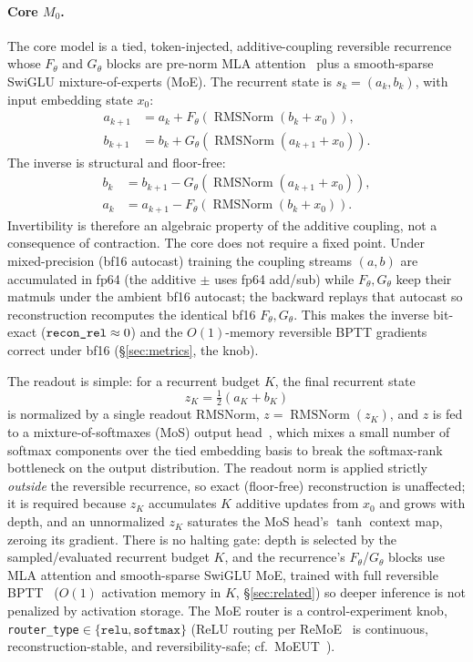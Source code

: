 \documentclass[11pt]{article}
\newcommand{\RMSNorm}{\operatorname{RMSNorm}}
\newcommand{\code}[1]{\texttt{#1}}
\begin{document}
\paragraph{Core \(M_0\).}
The core model is a tied, token-injected, additive-coupling reversible recurrence whose \(F_\theta\)
and \(G_\theta\) blocks are pre-norm MLA attention~\cite{deepseekv2} plus a smooth-sparse SwiGLU
mixture-of-experts (MoE).  The recurrent state is
\(s_k=(a_k,b_k)\), with input embedding state \(x_0\):
\begin{align}
  a_{k+1}
  &=
  a_k+F_\theta\!\left(\RMSNorm(b_k+x_0)\right),
  \\
  b_{k+1}
  &=
  b_k+G_\theta\!\left(\RMSNorm(a_{k+1}+x_0)\right).
\end{align}
The inverse is structural and floor-free:
\begin{align}
  b_k
  &=
  b_{k+1}-G_\theta\!\left(\RMSNorm(a_{k+1}+x_0)\right),
  \\
  a_k
  &=
  a_{k+1}-F_\theta\!\left(\RMSNorm(b_k+x_0)\right).
\end{align}
Invertibility is therefore an algebraic property of the additive coupling, not a consequence of
contraction.  The core does not require a fixed point.  Under mixed-precision (bf16 autocast) training
the coupling streams \((a,b)\) are accumulated in fp64 (the additive \(\pm\) uses fp64 add/sub) while
\(F_\theta,G_\theta\) keep their matmuls under the ambient bf16 autocast; the backward replays that
autocast so reconstruction recomputes the identical bf16 \(F_\theta,G_\theta\).  This makes the inverse
bit-exact (\(\code{\detokenize{recon_rel}}\approx0\)) and the \(O(1)\)-memory reversible BPTT gradients
correct under bf16 (\S\ref{sec:metrics}, the \code{} knob).

The readout is simple: for a recurrent budget \(K\), the final recurrent state
\[
  z_K=\tfrac12\!\left(a_K+b_K\right)
\]
is normalized by a single readout RMSNorm, \(z=\RMSNorm(z_K)\), and \(z\) is fed to a
mixture-of-softmaxes (MoS) output head~\cite{mos}, which mixes a small number of softmax
components over the tied embedding basis to break the softmax-rank bottleneck on the output
distribution.  The readout norm is applied strictly \emph{outside} the reversible recurrence, so
exact (floor-free) reconstruction is unaffected; it is required because \(z_K\) accumulates \(K\)
additive updates from \(x_0\) and grows with depth, and an unnormalized \(z_K\) saturates the
MoS head's \(\tanh\) context map, zeroing its gradient.  There is no halting gate: depth is selected by the sampled/evaluated recurrent budget
\(K\), and the recurrence's \(F_\theta\)/\(G_\theta\) blocks use MLA attention and smooth-sparse
SwiGLU MoE, trained with full reversible BPTT~\cite{revffn,revnet} (\(O(1)\) activation memory in
\(K\), \S\ref{sec:related}) so deeper inference is not penalized by activation storage.  The MoE router is a control-experiment
knob, \texttt{router\_type}\(\in\{\texttt{relu},\texttt{softmax}\}\) (ReLU routing per
ReMoE~\cite{remoe} is continuous, reconstruction-stable, and reversibility-safe; cf.\
MoEUT~\cite{moeut}).
\end{document}
